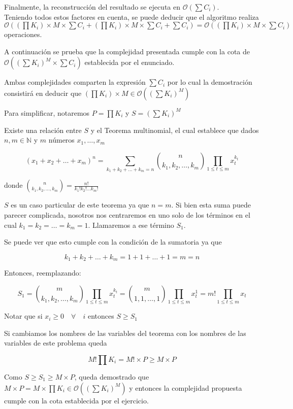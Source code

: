 Finalmente, la reconstrucción del resultado se ejecuta en $\mathcal{O}(\sum C_i)$.
\\

Teniendo todos estos factores en cuenta, se puede deducir que el algoritmo realiza $\mathcal{O}((\prod K_i) \times M \times \sum C_i + (\prod K_i) \times M \times \sum C_i + \sum C_i) = \mathcal{O}((\prod K_i) \times M \times \sum C_i)$ operaciones.

A continuación se prueba que la complejidad presentada cumple con la cota de $\mathcal{O}((\sum K_i)^M \times \sum C_i)$ establecida por el enunciado.

Ambas complejidades comparten la expresión $\sum C_i$ por lo cual la demostración consistirá en deducir que $(\prod K_i) \times M \in \mathcal{O}((\sum K_i)^M)$

Para simplificar, notaremos $P = \prod K_i$ y $S = (\sum K_i)^M$

Existe una relación entre $S$ y el Teorema multinomial, el cual establece que dados $n, m \in \mathbb{N}$ y $m$ números $x_1, \ldots , x_m$

$$(x_1 + x_2 + \ldots + x_m)^n = \sum_{k_1 + k_2 + \ldots + k_m = n} \binom{n}{k_1, k_2, \ldots , k_m} \prod_{1 \leq t \leq m} x_t^{k_t}$$

donde $\binom{n}{k_1, k_2, \ldots , k_m} = \frac{n!}{k_1! k_2! \ldots k_m!}$

$S$ es un caso particular de este teorema ya que $n = m$. Si bien esta suma puede parecer complicada, nosotros nos centraremos en uno solo de los términos en el cual $k_1 = k_2 = \ldots = k_m = 1$. Llamaremos a ese término $S_1$.

Se puede ver que esto cumple con la condición de la sumatoria ya que

$$k_1 + k_2 + \ldots + k_m = 1 + 1 + \ldots + 1 = m = n$$

Entonces, reemplazando:

$$S_1 = \binom{m}{k_1, k_2, \ldots , k_m} \prod_{1 \leq t \leq m} x_t^{k_t} = \binom{m}{1, 1, \ldots , 1} \prod_{1 \leq t \leq m} x_t^{1} = m! \prod_{1 \leq t \leq m} x_t $$

Notar que si $x_i \geq 0 \quad \forall \quad i$ entonces $S \geq S_1$

Si cambiamos los nombres de las variables del teorema con los nombres de las variables de este problema queda

$$M! \prod K_i = M! \times P \geq M \times P$$

Como $S \geq S_1 \geq M \times P$, queda demostrado que $M \times P = M \times \prod K_i \in \mathcal{O}((\sum K_i)^M)$ y entonces la complejidad propuesta cumple con la cota establecida por el ejercicio.\QEDB

